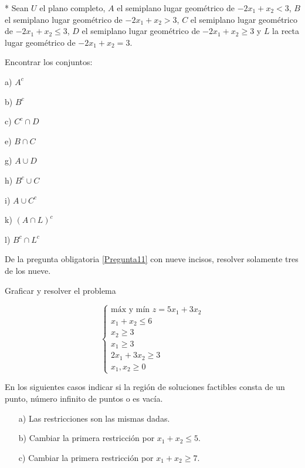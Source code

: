 \begin{Quest}*\label{Pregunta11}
 Sean $U$ el plano completo, $A$ el semiplano lugar geom\'etrico de $-2x_1 + x_2 < 3$,  
$B$ el semiplano lugar geom\'etrico de $-2x_1 + x_2 > 3$,  
$C$ el semiplano lugar geom\'etrico de $-2x_1 + x_2 \le 3$,  
$D$ el semiplano lugar geom\'etrico de $-2x_1 + x_2 \ge 3$  
y $L$ la recta lugar geom\'etrico de $-2x_1 + x_2 = 3$.

Encontrar los conjuntos:

\begin{itemize}
\begin{multicols}{3}
\item[a) ] $A^c$
\item[b)] $ B^c $
\item[c)] $C^{c} \cap D$
\item[e)] $B \cap C$
\item[g)] $A \cup D$
\item[h)] $B^{c} \cup C$
\item[i)] $A \cup C^{c}$
\item[k)] $(A \cap L)^{c}$
\item[l)] $B^{c} \cap L^{c}$
\end{multicols}
\end{itemize}

\end{Quest}

\begin{Note}\label{Nota7}
De la pregunta obligatoria \ref{Pregunta11} con nueve incisos, resolver solamente tres de los nueve.
\end{Note}

\begin{Quest}\label{Pregunta12}
Graficar y resolver el problema

\[
\begin{cases}
\text{m\'ax y m\'in } z = 5x_1 + 3x_2 \\
x_1 + x_2 \le 6 \\
x_2 \ge 3 \\
x_1 \ge 3 \\
2x_1 + 3x_2 \ge 3 \\
x_1,x_2 \ge 0
\end{cases}
\]

En los siguientes casos indicar si la regi\'on de soluciones factibles consta de un punto, n\'umero infinito de puntos o es vac\'ia.

\begin{itemize}
\item[a)] Las restricciones son las mismas dadas.
\item[b)] Cambiar la primera restricci\'on por $x_1 + x_2 \le 5$.
\item[c)] Cambiar la primera restricci\'on por $x_1 + x_2 \ge 7$.
\end{itemize}

\end{Quest}

